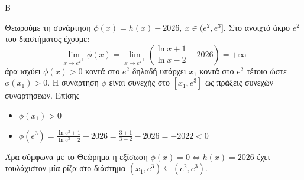 \begin{thema}{Β}
\begin{erwthma}
\item Θεωρούμε τη συνάρτηση $\phi(x)=h(x)-2026,\ x\in(e^2,e^3]$. Στο ανοιχτό άκρο $e^2$ του διαστήματος έχουμε:
\[\lim\limits_{x\to {e^{2}}^+}\phi(x)=\lim\limits_{x\to{e^2}^+}\left(\frac{\ln{x}+1}{\ln{x}-2}-2026\right)=+\infty\]
άρα ισχύει $\phi(x)>0$ κοντά στο $e^2$ δηλαδή υπάρχει $x_1$ κοντά στο $e^2$ τέτοιο ώστε $\phi(x_1)>0$. Η συνάρτηση $\phi$ είναι συνεχής στο $[x_1,e^3]$ ως πράξεις συνεχών συναρτήσεων. Επίσης
\begin{itemize}
\item $\phi(x_1)>0$
\item $\phi(e^3)=\frac{\ln{e^3}+1}{\ln{e^3}-2}-2026=\frac{3+1}{3-2}-2026=-2022<0$
\end{itemize}
Άρα σύμφωνα με το Θεώρημα  η εξίσωση $\phi(x)=0\Leftrightarrow h(x) = 2026$ έχει τουλάχιστον μία ρίζα στο διάστημα $(x_1,e^3)\subseteq(e^2, e^3)$.
\end{erwthma}
\end{thema}

